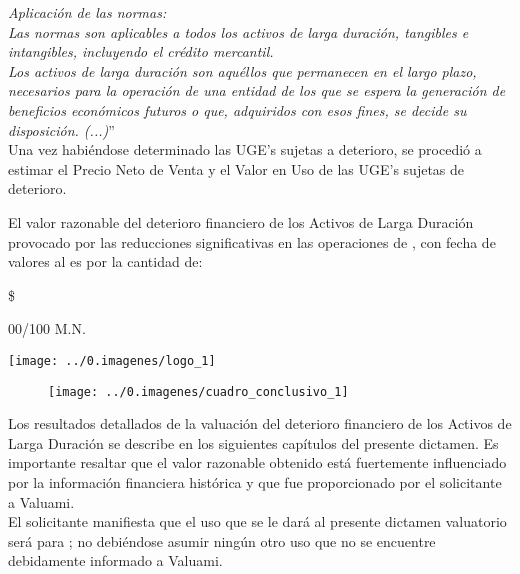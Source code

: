 \textit{Aplicación de las normas:}\\

\textit{Las normas son aplicables a todos los activos de larga duración, tangibles e intangibles, incluyendo el crédito mercantil.}\\

\textit{Los activos de larga duración son aquéllos que permanecen en el largo plazo, necesarios para la operación de una entidad de los que se espera la generación de beneficios económicos futuros o que, adquiridos con esos fines, se decide su disposición. (...)}”\\


Una vez habiéndose determinado las UGE's sujetas a deterioro,  se procedió a estimar el \textcolor{principal}{Precio Neto de Venta} y el \textcolor{principal}{Valor en Uso} de las UGE's sujetas de deterioro.

El valor razonable del deterioro financiero de los Activos de Larga Duración provocado por las reducciones significativas en las operaciones de \textcolor{principal}{\empresaSolicitante}, con fecha de valores al \fechaValores{} es por la cantidad de:


\begin{center}
\begin{minipage}{8cm}
\textcolor{principal}{\$\valorDeterioro{} \monedaCode}

\textcolor{principal}{\valorDeterioroLetra{} \moneda{} 00/100 M.N.}

\end{minipage}
\quad
\begin{minipage}{4cm}
\texttt{[image: ../0.imagenes/logo\_1]}
\end{minipage}

\begin{figure}[H]
\centering
\texttt{[image: ../0.imagenes/cuadro\_conclusivo\_1]}
\end{figure}

\end{center}

Los resultados detallados de la valuación del deterioro financiero de los Activos de Larga Duración se describe en los siguientes capítulos del presente dictamen. Es importante resaltar que el valor razonable obtenido está fuertemente influenciado por la información financiera histórica y que fue proporcionado por el solicitante a \textcolor{principal}{Valuami}.\\ 

El solicitante manifiesta que el uso que se le dará al presente dictamen valuatorio será para \textcolor{principal}{\textit{\usoAvaluo}}; no debiéndose asumir ningún otro uso que no se encuentre debidamente informado a \textcolor{principal}{Valuami}.\\

